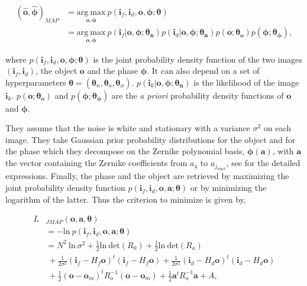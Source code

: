 \begin{align}
(\hat{\mathbf{o}},\hat{\boldsymbol{\phi}})_{MAP} &= \underset{\mathbf{o},\boldsymbol{\phi}}{\mathrm{arg \ max}} \ p(\mathbf{i}_f,\mathbf{i}_d,\mathbf{o},\boldsymbol{\phi};\boldsymbol{\theta})\nonumber \\
&= \underset{\mathbf{o},\boldsymbol{\phi}}{\mathrm{arg \ max}} \ p(\mathbf{i}_f|\mathbf{o},\boldsymbol{\phi};\boldsymbol{\theta_n})p(\mathbf{i}_d|\mathbf{o},\boldsymbol{\phi};\boldsymbol{\theta_n})p(\mathbf{o};\boldsymbol{\theta_o})p(\boldsymbol{\phi};\boldsymbol{\theta_{\phi}}), 
\end{align}

where $p(\mathbf{i}_f,\mathbf{i}_d,\mathbf{o},\boldsymbol{\phi};\boldsymbol{\theta})$ is the joint probability density function of the two images $(\mathbf{i}_f,\mathbf{i}_d)$, the object $\mathbf{o}$ and the phase $\boldsymbol{\phi}$. It can also depend on a set of hyperparameters $\boldsymbol{\theta} = (\boldsymbol{\theta}_n,\boldsymbol{\theta}_o,\boldsymbol{\theta}_{\phi})$. $p(\mathbf{i}_k|\mathbf{o},\boldsymbol{\phi};\boldsymbol{\theta_n})$ is the likelihood of the image $\mathbf{i}_k$. $p(\mathbf{o};\boldsymbol{\theta_o})$ and $p(\boldsymbol{\phi};\boldsymbol{\theta_{\phi}})$ are the \textit{a priori} probability density functions of $\mathbf{o}$ and $\boldsymbol{\phi}$.

They assume that the noise is white and stationary with a variance $\sigma^2$ on each image. They take Gaussian prior probability distributions for the object and for the phase which they decompose on the Zernike polynomial basis, $\boldsymbol{\phi}(\mathbf{a})$, with $\mathbf{a}$ the vector containing the Zernike coefficients from $a_4$ to $a_{j_{max}}$, see \citet[p.18-19]{mugnier_2006} for the detailed expressions. Finally, the phase and the object are retrieved by maximizing the joint probability density function $p(\mathbf{i}_f,\mathbf{i}_d,\mathbf{o},\mathbf{a};\boldsymbol{\theta})$ or by minimizing the logarithm of the latter. Thus the criterion to minimize is given by,

\begin{align}
L&_{JMAP}(\mathbf{o},\mathbf{a},\boldsymbol{\theta}) \nonumber\\
&= -\mathrm{ln} \ p(\mathbf{i}_f,\mathbf{i}_d,\mathbf{o},\mathbf{a};\boldsymbol{\theta}) \nonumber \\
&= N^2\ \mathrm{ln}\ \sigma^2 + \frac{1}{2}\mathrm{ln}\ \mathrm{det}(R_0) + \frac{1}{2}\mathrm{ln}\ \mathrm{det}(R_a)\nonumber\\
& \ + \frac{1}{2\sigma^2}(\mathbf{i}_f -H_f\mathbf{o})^t(\mathbf{i}_f -H_f\mathbf{o})+ \frac{1}{2\sigma^2}(\mathbf{i}_d - H_d \mathbf{o})^t(\mathbf{i}_d-H_d\mathbf{o})\nonumber\\
& \ + \frac{1}{2}(\mathbf{o}-\mathbf{o}_m)^t R_o^{-1}(\mathbf{o}-\mathbf{o}_m) + \frac{1}{2}\mathbf{a}^tR_a^{-1}\mathbf{a} + A,
\end{align}

